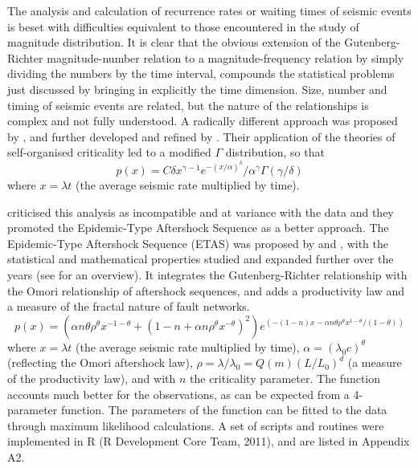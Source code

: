 \documentclass{report}
\begin{document}
The analysis and calculation of recurrence rates or waiting times of
seismic events is beset with difficulties equivalent to those
encountered in the study of magnitude distribution. It is clear that
the obvious extension of the Gutenberg-Richter magnitude-number
relation to a magnitude-frequency relation by simply dividing the
numbers by the time interval, compounds the statistical problems just
discussed by bringing in explicitly the time dimension. Size, number
and timing of seismic events are related, but the nature of the
relationships is complex and not fully understood.  A radically
different approach was proposed by , and
further developed and refined by
. Their
application of the theories of self-organised criticality led to a
modified $\Gamma$ distribution, so that
\begin{equation}
  \label{eq:mod_gamma}
  p(x) = C \delta x^{\gamma-1} e^{-(x/\alpha)^{\delta}} / \alpha^\gamma \Gamma(\gamma/\delta)   
\end{equation}
where $x = \lambda t$ (the average seismic rate multiplied by time).

 criticised this analysis as
incompatible and at variance with the data and they promoted the
Epidemic-Type Aftershock Sequence as a better approach.  The
Epidemic-Type Aftershock Sequence (ETAS) was proposed by
 and , with
the statistical and mathematical properties studied and expanded
further over the years (see  for an
overview). It integrates the Gutenberg-Richter relationship with the
Omori relationship of aftershock sequences, and adds a productivity
law and a measure of the fractal nature of fault networks.
\begin{equation}
  \label{eq:etas}
p(x) = (\alpha n \theta \rho^\theta x^{-1-\theta} + (1 - n + \alpha n \rho^\theta x^{-\theta})^2) e^{( -(1 - n) x - \alpha n \theta \rho^\theta x^{1-\theta}/(1-\theta))}
\end{equation}
where $x = \lambda t$ (the average seismic rate multiplied by time),
$\alpha = (\lambda_0 c)^\theta$ (reflecting the Omori aftershock law),
$\rho = \lambda/ \lambda_0 = Q(m) (L/L_0)^d$ (a measure of the
productivity law), and with $n$ the criticality parameter. The function
accounts much better for the observations, as can be expected from a
4-parameter function.  The parameters of the function can be fitted to
the data through maximum likelihood calculations. A set of scripts and
routines were implemented in R (R Development Core Team, 2011), and
are listed in Appendix A2.
\end{document}
